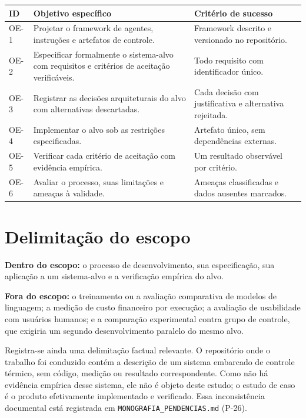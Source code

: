 \begin{quadro}[htb]
	\caption{Objetivos específicos e critério de sucesso}
	\label{qua:objetivos}
	\centering
	\footnotesize
	\begin{tabularx}{\textwidth}{@{}p{1.1cm} X p{3.4cm}@{}}
		\toprule
		\textbf{ID} & \textbf{Objetivo específico} & \textbf{Critério de sucesso} \\
		\midrule
		OE-1 & Projetar o framework de agentes, instruções e artefatos de controle. & Framework descrito e versionado no repositório. \\
		\addlinespace
		OE-2 & Especificar formalmente o sistema-alvo com requisitos e critérios de aceitação verificáveis. & Todo requisito com identificador único. \\
		\addlinespace
		OE-3 & Registrar as decisões arquiteturais do alvo com alternativas descartadas. & Cada decisão com justificativa e alternativa rejeitada. \\
		\addlinespace
		OE-4 & Implementar o alvo sob as restrições especificadas. & Artefato único, sem dependências externas. \\
		\addlinespace
		OE-5 & Verificar cada critério de aceitação com evidência empírica. & Um resultado observável por critério. \\
		\addlinespace
		OE-6 & Avaliar o processo, suas limitações e ameaças à validade. & Ameaças classificadas e dados ausentes marcados. \\
		\bottomrule
	\end{tabularx}
\end{quadro}

\section{Delimitação do escopo}
\label{sec:delimitacao}

\textbf{Dentro do escopo:} o processo de desenvolvimento, sua especificação,
sua aplicação a um sistema-alvo e a verificação empírica do alvo.

\textbf{Fora do escopo:} o treinamento ou a avaliação comparativa de modelos de
linguagem; a medição de custo financeiro por execução; a avaliação de usabilidade
com usuários humanos; e a comparação experimental contra grupo de controle, que
exigiria um segundo desenvolvimento paralelo do mesmo alvo.

Registra-se ainda uma delimitação factual relevante. O repositório onde o
trabalho foi conduzido contém a descrição de um sistema embarcado de controle
térmico, sem código, medição ou resultado correspondente. Como não há evidência
empírica desse sistema, ele não é objeto deste estudo; o estudo de caso é o
produto efetivamente implementado e verificado. Essa inconsistência documental
está registrada em \texttt{MONOGRAFIA\_PENDENCIAS.md} (P-26).


